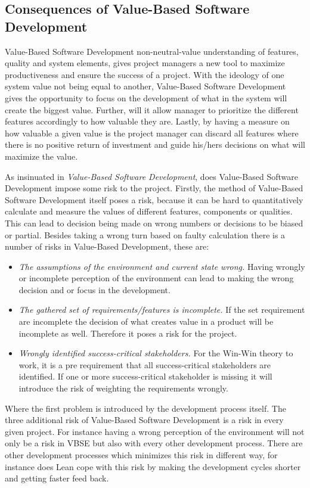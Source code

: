\documentclass{sig-alternate}
\begin{document}
\subsection{Consequences of Value-Based Software Development}
\label{sec:disValueOrient}
Value-Based Software Development non-neutral-value understanding of features, quality and system elements, gives project managers a new tool to maximize productiveness and ensure the success of a project. With the ideology of one system value not being equal to another, Value-Based Software Development gives the opportunity to focus on the development of what in the system will create the biggest value. Further, will it allow manager to prioritize the different features accordingly to how valuable they are. Lastly, by having a measure on how valuable a given value is the project manager can discard all features where there is no positive return of investment and guide his/hers decisions on what will maximize the value.  

As insinuated in \textit{Value-Based Software Development}, does Value-Based Software Development impose some risk to the project. 
Firstly, the method of Value-Based Software Development itself poses a risk, because it can be hard to quantitatively calculate and measure the values of different features, components or qualities. This can lead to decision being made on wrong numbers or decisions to be biased or partial. Besides taking a wrong turn based on faulty calculation there is a number of risks in Value-Based Development, these are:  
\begin{itemize}
\item \textit{The assumptions of the environment and current state wrong.} Having wrongly or incomplete perception of the environment can lead to making the wrong decision and or focus in the development.  
\item \textit{The gathered set of requirements/features is incomplete.} If the set requirement are incomplete the decision of what creates value in a product will be incomplete as well. Therefore it poses a risk for the project.
\item \textit{Wrongly identified success-critical stakeholders.} For the Win-Win theory to work, it is a pre requirement that all success-critical stakeholders are identified. If one or more success-critical stakeholder is missing it will introduce the risk of weighting the requirements wrongly. 
\end{itemize} 

Where the first problem is introduced by the development process itself. The three additional risk of Value-Based Software Development is a risk in every given project. For instance having a wrong perception of the environment will not only be a risk in VBSE but also with every other development process. There are other development processes which minimizes this risk in different way, for instance does Lean cope with this risk by making the development cycles shorter and getting faster feed back. 
 
\end{document}
